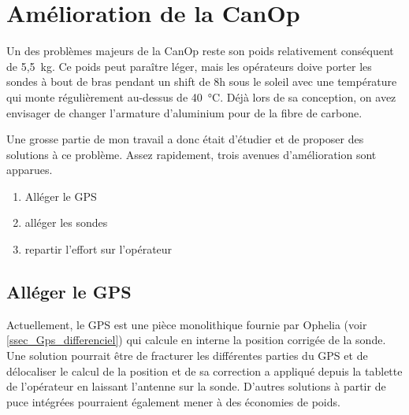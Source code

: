 \section{Amélioration de la CanOp}

Un des problèmes majeurs de la CanOp reste son poids relativement conséquent de 5,5~kg. Ce poids peut paraître léger, mais les opérateurs doive porter les sondes à bout de bras pendant un shift de 8h sous le soleil avec une température qui monte régulièrement au-dessus de 40~°C. Déjà lors de sa conception, on avez envisager de changer l'armature d'aluminium pour de la fibre de carbone. 

Une grosse partie de mon travail a donc était d'étudier et de proposer des solutions à ce problème. Assez rapidement, trois avenues d'amélioration sont apparues.
\begin{enumerate}
    \item Alléger le GPS 
    \item alléger les sondes
    \item repartir l'effort sur l'opérateur
\end{enumerate}

\subsection{Alléger le GPS}
Actuellement, le GPS est une pièce monolithique fournie par Ophelia (voir \cref{ssec_Gps_differenciel}) qui calcule en interne la position corrigée de la sonde. Une solution pourrait être de fracturer les différentes parties du GPS et de délocaliser le calcul de la position et de sa correction a appliqué depuis la tablette de l'opérateur en laissant l'antenne sur la sonde. D'autres solutions à partir de puce intégrées pourraient également mener à des économies de poids.


